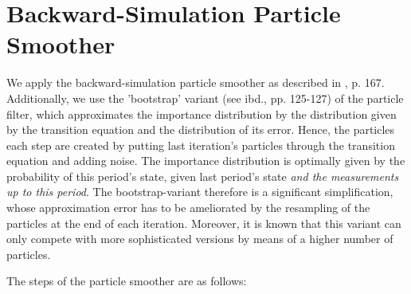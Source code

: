 \documentclass[11pt, a4paper, leqno]{article}
\begin{document}
\section{Backward-Simulation Particle  Smoother}
\label{sec: bakward-simulation particle smoother}
We apply the backward-simulation particle smoother as described in \citet{sarkka2013}, p. 167. Additionally, we use the 'bootstrap' variant (see ibd., pp. 125-127) of the particle filter, which approximates the importance distribution by the distribution given by the transition equation and the distribution of its error. Hence, the particles each step are created by putting last iteration's particles through the transition equation and adding noise. The importance distribution is optimally given by the probability of this period's state, given last period's state \textit{and the measurements up to this period}. The bootstrap-variant therefore is a significant simplification, whose approximation error has to be ameliorated by the resampling of the particles at the end of each iteration. Moreover, it is known that this variant can only compete with more sophisticated versions by means of a higher number of particles.\par
The steps of the particle smoother are as follows:
\end{document}
